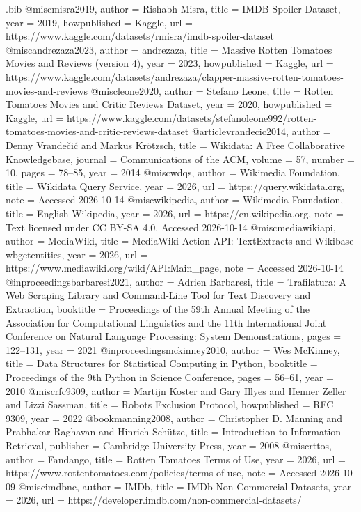 \begin{filecontents*}[overwrite]{\jobname.bib}
  @misc{misra2019,
    author = {Rishabh Misra},
    title = {{IMDB} Spoiler Dataset},
    year = {2019},
    howpublished = {Kaggle},
    url = {https://www.kaggle.com/datasets/rmisra/imdb-spoiler-dataset}
  }
  @misc{andrezaza2023,
    author = {andrezaza},
    title = {Massive Rotten Tomatoes Movies and Reviews (version 4)},
    year = {2023},
    howpublished = {Kaggle},
    url = {https://www.kaggle.com/datasets/andrezaza/clapper-massive-rotten-tomatoes-movies-and-reviews}
  }
  @misc{leone2020,
    author = {Stefano Leone},
    title = {Rotten Tomatoes Movies and Critic Reviews Dataset},
    year = {2020},
    howpublished = {Kaggle},
    url = {https://www.kaggle.com/datasets/stefanoleone992/rotten-tomatoes-movies-and-critic-reviews-dataset}
  }
  @article{vrandecic2014,
    author = {Denny Vrande{\v{c}}i{\'c} and Markus Kr{\"o}tzsch},
    title = {Wikidata: A Free Collaborative Knowledgebase},
    journal = {Communications of the ACM},
    volume = {57},
    number = {10},
    pages = {78--85},
    year = {2014}
  }
  @misc{wdqs,
    author = {{Wikimedia Foundation}},
    title = {Wikidata Query Service},
    year = {2026},
    url = {https://query.wikidata.org},
    note = {Accessed 2026-10-14}
  }
  @misc{wikipedia,
    author = {{Wikimedia Foundation}},
    title = {English Wikipedia},
    year = {2026},
    url = {https://en.wikipedia.org},
    note = {Text licensed under CC BY-SA 4.0. Accessed 2026-10-14}
  }
  @misc{mediawikiapi,
    author = {{MediaWiki}},
    title = {MediaWiki Action API: TextExtracts and Wikibase wbgetentities},
    year = {2026},
    url = {https://www.mediawiki.org/wiki/API:Main_page},
    note = {Accessed 2026-10-14}
  }
  @inproceedings{barbaresi2021,
    author = {Adrien Barbaresi},
    title = {Trafilatura: A Web Scraping Library and Command-Line Tool for Text Discovery and Extraction},
    booktitle = {Proceedings of the 59th Annual Meeting of the Association for Computational Linguistics and the 11th International Joint Conference on Natural Language Processing: System Demonstrations},
    pages = {122--131},
    year = {2021}
  }
  @inproceedings{mckinney2010,
    author = {Wes McKinney},
    title = {Data Structures for Statistical Computing in Python},
    booktitle = {Proceedings of the 9th Python in Science Conference},
    pages = {56--61},
    year = {2010}
  }
  @misc{rfc9309,
    author = {Martijn Koster and Gary Illyes and Henner Zeller and Lizzi Sassman},
    title = {Robots Exclusion Protocol},
    howpublished = {RFC 9309},
    year = {2022}
  }
  @book{manning2008,
    author = {Christopher D. Manning and Prabhakar Raghavan and Hinrich Sch{\"u}tze},
    title = {Introduction to Information Retrieval},
    publisher = {Cambridge University Press},
    year = {2008}
  }
  @misc{rttos,
    author = {Fandango},
    title = {Rotten Tomatoes Terms of Use},
    year = {2026},
    url = {https://www.rottentomatoes.com/policies/terms-of-use},
    note = {Accessed 2026-10-09}
  }
  @misc{imdbnc,
    author = {IMDb},
    title = {{IMDb} Non-Commercial Datasets},
    year = {2026},
    url = {https://developer.imdb.com/non-commercial-datasets/}
  }
\end{filecontents*}

